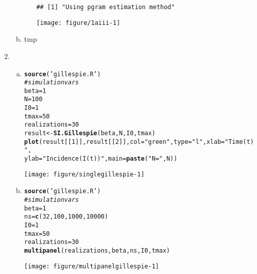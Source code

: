 \documentclass[12pt]{article}\usepackage[]{graphicx}\usepackage[]{color}
\makeatletter
\def\maxwidth{ %
  \ifdim\Gin@nat@width>\linewidth
    \linewidth
  \else
    \Gin@nat@width
  \fi
}
\newcommand{\hlnum}[1]{\textcolor[rgb]{0.686,0.059,0.569}{#1}}%
\newcommand{\hlstr}[1]{\textcolor[rgb]{0.192,0.494,0.8}{#1}}%
\newcommand{\hlcom}[1]{\textcolor[rgb]{0.678,0.584,0.686}{\textit{#1}}}%
\newcommand{\hlstd}[1]{\textcolor[rgb]{0.345,0.345,0.345}{#1}}%
\newcommand{\hlkwb}[1]{\textcolor[rgb]{0.69,0.353,0.396}{#1}}%
\newcommand{\hlkwc}[1]{\textcolor[rgb]{0.333,0.667,0.333}{#1}}%
\newcommand{\hlkwd}[1]{\textcolor[rgb]{0.737,0.353,0.396}{\textbf{#1}}}%
\newenvironment{kframe}{%
 \def\at@end@of@kframe{}%
 \ifinner\ifhmode%
  \def\at@end@of@kframe{\end{minipage}}%
  \begin{minipage}{\columnwidth}%
 \fi\fi%
 \def\FrameCommand##1{\hskip\@totalleftmargin \hskip-\fboxsep
 \colorbox{shadecolor}{##1}\hskip-\fboxsep
     \hskip-\linewidth \hskip-\@totalleftmargin \hskip\columnwidth}%
 \MakeFramed {\advance\hsize-\width
   \@totalleftmargin\z@ \linewidth\hsize
   \@setminipage}}%
 {\par\unskip\endMakeFramed%
 \at@end@of@kframe}
\newenvironment{knitrout}{}{} %
\makeatother
\begin{document}
\begin{enumerate}
\begin{enumerate}[(a)]
\begin{enumerate}[(i)]
\begin{knitrout}
\color{fgcolor}\begin{kframe}
\begin{verbatim}
## [1] "Using pgram estimation method"
\end{verbatim}
\end{kframe}
\texttt{[image: figure/1aiii-1]} 

\end{knitrout}


        \end{enumerate}
        \item \TSb


tmp
    \end{enumerate}
    \item \SEintro
    \begin{enumerate}[(a)]
        \item

\begin{knitrout}
\color{fgcolor}\begin{kframe}
\begin{alltt}
\hlkwd{source}\hlstd{(}\hlstr{'gillespie.R'}\hlstd{)}
\hlcom{#simulation vars}
\hlstd{beta} \hlkwb{=} \hlnum{1}
\hlstd{N} \hlkwb{=} \hlnum{100}
\hlstd{I0} \hlkwb{=} \hlnum{1}
\hlstd{tmax} \hlkwb{=} \hlnum{50}
\hlstd{realizations} \hlkwb{=} \hlnum{30}
\hlstd{result} \hlkwb{<-} \hlkwd{SI.Gillespie}\hlstd{(beta,N,I0,tmax)}
\hlkwd{plot}\hlstd{(result[[}\hlnum{1}\hlstd{]], result[[}\hlnum{2}\hlstd{]],} \hlkwc{col}\hlstd{=}\hlstr{"green"}\hlstd{,} \hlkwc{type}\hlstd{=}\hlstr{"l"}\hlstd{,} \hlkwc{xlab}\hlstd{=}\hlstr{"Time (t)"}\hlstd{,}
     \hlkwc{ylab}\hlstd{=}\hlstr{"Incidence (I(t))"}\hlstd{,} \hlkwc{main}\hlstd{=}\hlkwd{paste}\hlstd{(}\hlstr{"N ="}\hlstd{,N))}
\end{alltt}
\end{kframe}
\texttt{[image: figure/singlegillespie-1]} 

\end{knitrout}
        \item

\begin{knitrout}
\color{fgcolor}\begin{kframe}
\begin{alltt}
\hlkwd{source}\hlstd{(}\hlstr{'gillespie.R'}\hlstd{)}
\hlcom{#simulation vars}
\hlstd{beta} \hlkwb{=} \hlnum{1}
\hlstd{ns} \hlkwb{=} \hlkwd{c}\hlstd{(}\hlnum{32}\hlstd{,}\hlnum{100}\hlstd{,}\hlnum{1000}\hlstd{,}\hlnum{10000}\hlstd{)}
\hlstd{I0} \hlkwb{=} \hlnum{1}
\hlstd{tmax} \hlkwb{=} \hlnum{50}
\hlstd{realizations} \hlkwb{=} \hlnum{30}
\hlkwd{multipanel}\hlstd{(realizations,beta,ns,I0,tmax)}
\end{alltt}
\end{kframe}
\texttt{[image: figure/multipanelgillespie-1]} 


\end{knitrout}
\end{enumerate}
\end{enumerate}
\end{document}
